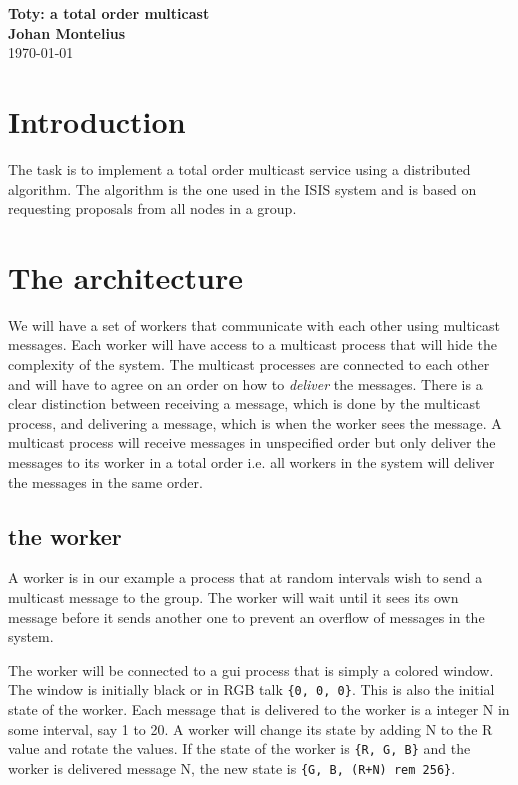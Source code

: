 \documentclass[a4paper,11pt]{article}
\newcommand{\nnsection}[1]{
\section*{#1}
\addcontentsline{toc}{section}{#1}
}
\begin{document}
\begin{center}
\vspace{20pt}
\textbf{\large Toty: a total order multicast}\\
\vspace{10pt}
\textbf{Johan Montelius}\\
\vspace{10pt}
\today{}
\end{center}

\nnsection{Introduction}

The task is to implement a total order multicast service using a
distributed algorithm. The algorithm is the one used in the ISIS
system and is based on requesting proposals from all nodes in a group.

\section{The architecture}

We will have a set of workers that communicate with each other using
multicast messages. Each worker will have access to a multicast
process that will hide the complexity of the system. The multicast
processes are connected to each other and will have to agree on an
order on how to {\em deliver} the messages. There is a clear
distinction between receiving a message, which is done by the
multicast process, and delivering a message, which is when the worker
sees the message. A multicast process will receive messages in
unspecified order but only deliver the messages to its worker in a
total order i.e. all workers in the system will deliver the messages
in the same order.

\subsection{the worker}

A worker is in our example a process that at random intervals wish to
send a multicast message to the group. The worker will wait until it
sees its own message before it sends another one to prevent an
overflow of messages in the system.

The worker will be connected to a gui process that is simply a colored
window. The window is initially black or in RGB talk {\tt \{0, 0,
  0\}}. This is also the initial state of the worker. Each message
that is delivered to the worker is a integer N in some interval, say 1
to 20. A worker will change its state by adding N to the R value and
rotate the values. If the state of the worker is {\tt \{R, G, B\}}
and the worker is delivered message N, the new state is {\tt \{G, B,
  (R+N) rem 256\}}.
\end{document}
